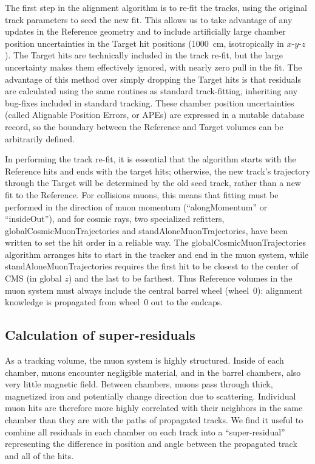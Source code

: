 \documentclass[12pt]{article}
\begin{document}
The first step in the alignment algorithm is to re-fit the tracks,
using the original track parameters to seed the new fit.  This allows
us to take advantage of any updates in the Reference geometry and to
include artificially large chamber position uncertainties in the
Target hit positions (1000~cm, isotropically in $x$-$y$-$z$).  The
Target hits are technically included in the track re-fit, but the
large uncertainty makes them effectively ignored, with nearly zero
pull in the fit.  The advantage of this method over simply dropping
the Target hits is that residuals are calculated using the same
routines as standard track-fitting, inheriting any bug-fixes included
in standard tracking.  These chamber position uncertainties (called
Alignable Position Errors, or APEs) are expressed in a mutable
database record, so the boundary between the Reference and Target
volumes can be arbitrarily defined.

In performing the track re-fit, it is essential that the algorithm
starts with the Reference hits and ends with the target hits;
otherwise, the new track's trajectory through the Target will be
determined by the old seed track, rather than a new fit to the
Reference.  For collisions muons, this means that fitting must be
performed in the direction of muon momentum (``alongMomentum'' or
``insideOut''), and for cosmic rays, two specialized refitters,
globalCosmicMuonTrajectories and standAloneMuonTrajectories, have been
written to set the hit order in a reliable way.  The
globalCosmicMuonTrajectories algorithm arranges hits to start in the
tracker and end in the muon system, while standAloneMuonTrajectories
requires the first hit to be closest to the center of CMS (in global
$z$) and the last to be farthest.  Thus Reference volumes in the muon
system must always include the central barrel wheel (wheel~0):
alignment knowledge is propagated from wheel~0 out to the endcaps.

\subsection{Calculation of super-residuals}
\label{sec:super_residuals}

As a tracking volume, the muon system is highly structured.  Inside of
each chamber, muons encounter negligible material, and in the barrel
chambers, also very little magnetic field.  Between chambers, muons
pass through thick, magnetized iron and potentially change direction
due to scattering.  Individual muon hits are therefore more highly
correlated with their neighbors in the same chamber than they are with
the paths of propagated tracks.  We find it useful to combine all
residuals in each chamber on each track into a ``super-residual''
representing the difference in position and angle between the
propagated track and all of the hits.
\end{document}
